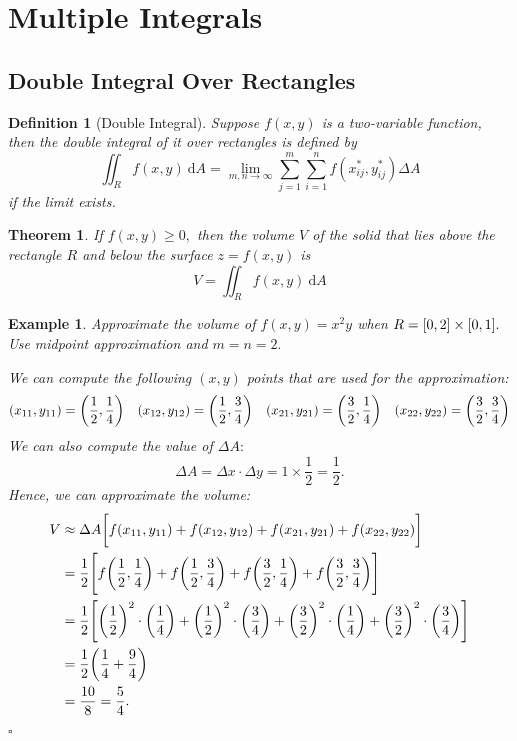 \documentclass[12pt,a4paper]{article}
\newtheorem{thm}{Theorem}[subsection]
\newtheorem{df}{Definition}[subsection]
\newtheorem{eg}{Example}[subsection]
\newenvironment*{ans}{\par\indent{\textit{Answer. }}\par}{\par\hfill{$\square$}\par}
\def\d{{\mathrm{d}}}
\def\iintR{\displaystyle\iint_R}
\begin{document}
\newpage
\section{Multiple Integrals}
\subsection{Double Integral Over Rectangles}
\begin{df}[Double Integral]
	Suppose $f(x,y)$ is a two-variable function, then the double integral of it over rectangles is defined by \[\iintR f(x,y)\ \d A=\lim_{m,n\to\infty}\sum_{j=1}^m\sum_{i=1}^n f(x_{ij}^*, y_{ij}^*)\Delta A\] if the limit exists. 	
\end{df}
\begin{thm}
	If $f(x,y)\geq0,$ then the volume $V$ of the solid that lies above the rectangle $R$ and below the surface $z=f(x,y)$ is \[V=\iintR f(x,y)\ \d A\]
\end{thm}
\begin{eg}
	Approximate the volume of $f(x,y)=x^2y$ when $R=\qty[0,2]\times\qty[0,1].$ Use midpoint approximation and $m=n=2.$	
	\begin{ans}
		We can compute the following $(x,y)$ points that are used for the approximation: \[(x_{11},y_{11})=\qty(\frac{1}{2}, \frac{1}{4})\quad(x_{12},y_{12})=\qty(\frac{1}{2}, \frac{3}{4})\quad(x_{21},y_{21})=\qty(\frac{3}{2}, \frac{1}{4})\quad(x_{22},y_{22})=\qty(\frac{3}{2}, \frac{3}{4})\] We can also compute the value of $\Delta A:$ \[\Delta A=\Delta x\cdot\Delta y=1\times\dfrac{1}{2}=\dfrac{1}{2}.\] Hence, we can approximate the volume: \[\begin{aligned}V&\approx\Delta A\qty\bigg[f(x_{11},y_{11})+f(x_{12},y_{12})+f(x_{21},y_{21})+f(x_{22},y_{22})]\\&=\dfrac{1}{2}\qty\Bigg[f\qty(\frac{1}{2}, \frac{1}{4})+f\qty(\frac{1}{2}, \frac{3}{4})+f\qty(\frac{3}{2}, \frac{1}{4})+f\qty(\frac{3}{2}, \frac{3}{4})]\\&=\dfrac{1}{2}\qty\Bigg[\qty(\dfrac{1}{2})^2\cdot\qty(\dfrac{1}{4})+\qty(\dfrac{1}{2})^2\cdot\qty(\dfrac{3}{4})+\qty(\dfrac{3}{2})^2\cdot\qty(\dfrac{1}{4})+\qty(\dfrac{3}{2})^2\cdot\qty(\dfrac{3}{4})]\\&=\dfrac{1}{2}\qty(\dfrac{1}{4}+\dfrac{9}{4})\\&=\dfrac{10}{8}=\dfrac{5}{4}.\end{aligned}\]
	\end{ans}
\end{eg}
\end{document}
